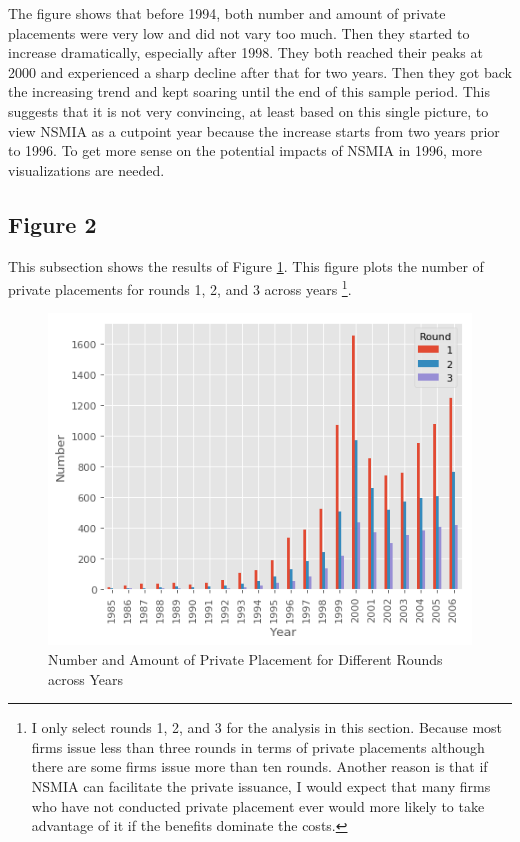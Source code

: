 \documentclass[letterpaper,12pt]{article}
\theoremstyle{definition}
\begin{document}
The figure shows that before 1994, both number and amount of private placements were very low and did not vary too much. Then they started to increase dramatically, especially after 1998. They both reached their peaks at 2000 and experienced a sharp decline after that for two years. Then they got back the increasing trend and kept soaring until the end of this sample period. This suggests that it is not very convincing, at least based on this single picture, to view NSMIA as a cutpoint year because the increase starts from two years prior to 1996. To get more sense on the potential impacts of NSMIA in 1996, more visualizations are needed.

\subsection{Figure 2}

This subsection shows the results of Figure \ref{fig:figure2}. This figure plots the number of private placements for rounds 1, 2, and 3 across years \footnote{I only select rounds 1, 2, and 3 for the analysis in this section. Because most firms issue less than three rounds in terms of private placements although there are some firms issue more than ten rounds. Another reason is that if NSMIA can facilitate the private issuance, I would expect that many firms who have not conducted private placement ever would more likely to take advantage of it if the benefits dominate the costs.}.

\begin{figure}[h]
	\centering
	\includegraphics[width=\textwidth]{figure2}
	\caption{Number and Amount of Private Placement for Different Rounds across Years}
	\label{fig:figure2}
\end{figure}
\end{document}
